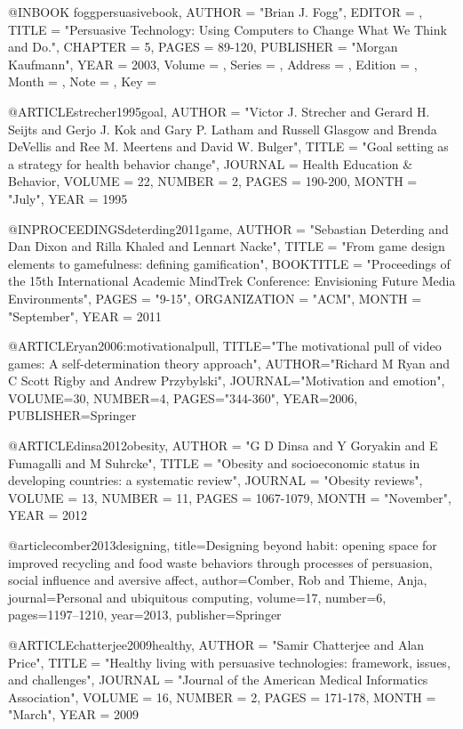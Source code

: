 @INBOOK{ foggpersuasivebook,
AUTHOR    = "Brian J. Fogg", 
EDITOR    = {},
TITLE     = "Persuasive Technology: Using Computers to Change What We Think and Do.",
CHAPTER   = {5},
PAGES     = {89-120},
PUBLISHER = "Morgan Kaufmann",
YEAR      = {2003},
Volume    = {},
Series    = {},
Address   = {},
Edition   = {},
Month     = {},
Note      = {},
Key       = {}
}



@ARTICLE{strecher1995goal,
	AUTHOR = "Victor J. Strecher and Gerard H. Seijts and Gerjo J. Kok and Gary P. Latham and Russell Glasgow and Brenda DeVellis and Ree M. Meertens and David W. Bulger",
	TITLE = "Goal setting as a strategy for health behavior change",
	JOURNAL = {Health Education \& Behavior},
	VOLUME = {22},
	NUMBER = {2},
	PAGES = {190-200},
	MONTH = "July",
	YEAR = {1995}	}

@INPROCEEDINGS{deterding2011game,
	AUTHOR = "Sebastian Deterding and Dan Dixon and Rilla Khaled and Lennart Nacke",
	TITLE = "From game design elements to gamefulness: defining gamification",
	BOOKTITLE = "Proceedings of the 15th International Academic MindTrek Conference: Envisioning Future Media Environments",
	PAGES = "9-15",
	ORGANIZATION = "ACM",
	MONTH = "September", 
	YEAR = {2011}	}
	
@ARTICLE{ryan2006:motivationalpull,
  TITLE="The motivational pull of video games: A self-determination theory approach",
  AUTHOR="Richard M Ryan and C Scott Rigby and Andrew Przybylski",
  JOURNAL="Motivation and emotion",
  VOLUME={30},
  NUMBER={4},
  PAGES="344-360",
  YEAR={2006},
  PUBLISHER={Springer}
}


@ARTICLE{dinsa2012obesity,
	AUTHOR = "G D Dinsa and Y Goryakin and E Fumagalli and M Suhrcke",
	TITLE = "Obesity and socioeconomic status in developing countries: a systematic review",
	JOURNAL = "Obesity reviews",
	VOLUME = {13},
	NUMBER = {11},
	PAGES = {1067-1079},
	MONTH = "November",
	YEAR = {2012}	}


@article{comber2013designing,
  title={Designing beyond habit: opening space for improved recycling and food waste behaviors through processes of persuasion, social influence and aversive affect},
  author={Comber, Rob and Thieme, Anja},
  journal={Personal and ubiquitous computing},
  volume={17},
  number={6},
  pages={1197--1210},
  year={2013},
  publisher={Springer}
}


@ARTICLE{chatterjee2009healthy,
	AUTHOR = "Samir Chatterjee and Alan Price",
	TITLE = "Healthy living with persuasive technologies: framework, issues, and challenges",
	JOURNAL = "Journal of the American Medical Informatics Association",
	VOLUME = {16},
	NUMBER = {2},
	PAGES = {171-178},
	MONTH = "March",
	YEAR = {2009}	}

